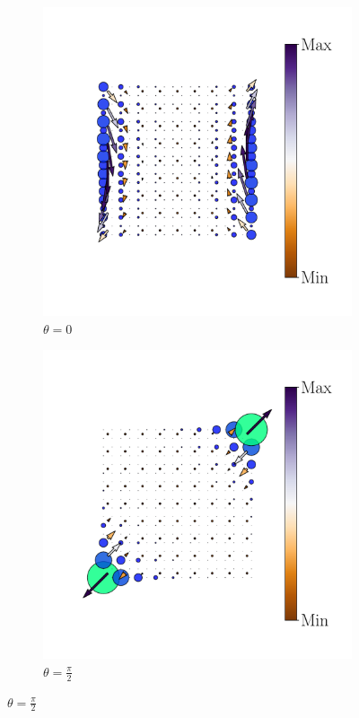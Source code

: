 \begin{figure}[tbh!]
\begin{minipage}[h!]{1.0\textwidth}
\begin{subfigure}[b!]{0.2 \textwidth}
         \end{subfigure}\hspace*{-0.5em}
          \begin{subfigure}[b!]{0.2 \textwidth}
             \caption*{$\theta = 0$}
             \includegraphics[width=\textwidth]{Imagenes/Resultados_pump_Cuadrado/y/hoti_pomp_y_pos3.pdf}
         \end{subfigure}\hspace*{-0.5em}
          \begin{subfigure}[b!]{0.2 \textwidth}
             \caption*{$\theta = \frac{\pi}{2}$}
             \includegraphics[width=\textwidth]{Imagenes/Resultados_pump_Cuadrado/y/hoti_pomp_y_pos4.pdf}

\end{subfigure}
\end{minipage}
\end{figure}
